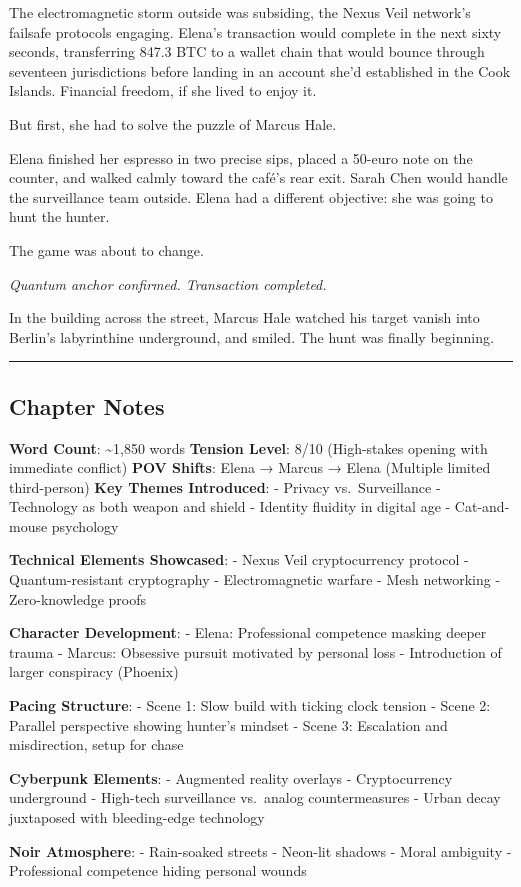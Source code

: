 The electromagnetic storm outside was subsiding, the Nexus Veil network's failsafe protocols engaging. Elena's transaction would complete in the next sixty seconds, transferring 847.3 BTC to a wallet chain that would bounce through seventeen jurisdictions before landing in an account she'd established in the Cook Islands. Financial freedom, if she lived to enjoy it.

But first, she had to solve the puzzle of Marcus Hale.

Elena finished her espresso in two precise sips, placed a 50-euro note on the counter, and walked calmly toward the café's rear exit. Sarah Chen would handle the surveillance team outside. Elena had a different objective: she was going to hunt the hunter.

The game was about to change.

\emph{Quantum anchor confirmed. Transaction completed.}

In the building across the street, Marcus Hale watched his target vanish into Berlin's labyrinthine underground, and smiled. The hunt was finally beginning.

\begin{center}\rule{0.5\linewidth}{0.5pt}\end{center}

\hypertarget{chapter-notes}{%
\subsection{Chapter Notes}\label{chapter-notes}}

\textbf{Word Count}: \textasciitilde1,850 words \textbf{Tension Level}: 8/10 (High-stakes opening with immediate conflict) \textbf{POV Shifts}: Elena → Marcus → Elena (Multiple limited third-person) \textbf{Key Themes Introduced}: - Privacy vs.~Surveillance - Technology as both weapon and shield - Identity fluidity in digital age - Cat-and-mouse psychology

\textbf{Technical Elements Showcased}: - Nexus Veil cryptocurrency protocol - Quantum-resistant cryptography - Electromagnetic warfare - Mesh networking - Zero-knowledge proofs

\textbf{Character Development}: - Elena: Professional competence masking deeper trauma - Marcus: Obsessive pursuit motivated by personal loss - Introduction of larger conspiracy (Phoenix)

\textbf{Pacing Structure}: - Scene 1: Slow build with ticking clock tension - Scene 2: Parallel perspective showing hunter's mindset - Scene 3: Escalation and misdirection, setup for chase

\textbf{Cyberpunk Elements}: - Augmented reality overlays - Cryptocurrency underground - High-tech surveillance vs.~analog countermeasures - Urban decay juxtaposed with bleeding-edge technology

\textbf{Noir Atmosphere}: - Rain-soaked streets - Neon-lit shadows - Moral ambiguity - Professional competence hiding personal wounds

